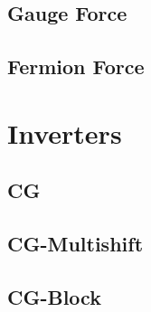 \documentclass[a4paper,12pt]{article}
\begin{document}
\subsection{Gauge Force}

\subsection{Fermion Force}

\section{Inverters}
\subsection{CG}
\subsection{CG-Multishift}
\subsection{CG-Block}
\end{document}
